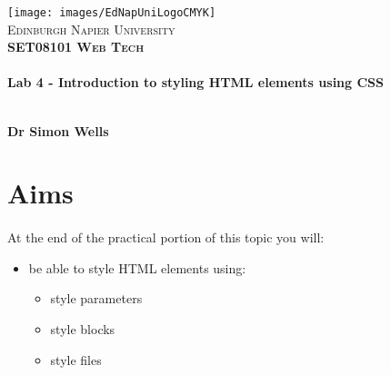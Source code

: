 \documentclass[10pt, a4paper, twosize]{article}
\begin{document}

\begin{titlepage}
\vspace*{5cm}
\begin{center}
\texttt{[image: images/EdNapUniLogoCMYK]}~\\[1cm]

\textsc{\Large Edinburgh Napier University}\\[1.5cm]

\textsc{\LARGE \bfseries SET08101 Web Tech}\\[0.5cm]

\hrulefill \\[0.4cm]
{\huge \bfseries Lab 4 - Introduction to styling HTML elements using CSS \\[0.4cm] }
\hrulefill \\[1.5cm]

\begin{minipage}{0.4\textwidth}
\begin{flushleft} \large
\textbf{Dr Simon Wells} \\
\end{flushleft}
\end{minipage}

\vfill

\end{center}
\end{titlepage}




%

\section{Aims}
\paragraph{} At the end of the practical portion of this topic you will:

\begin{itemize}
\item be able to style HTML elements using:
    \begin{itemize}
    \item style parameters
    \item style blocks
    \item style files
    \end{itemize}
\end{itemize}
\end{document}
